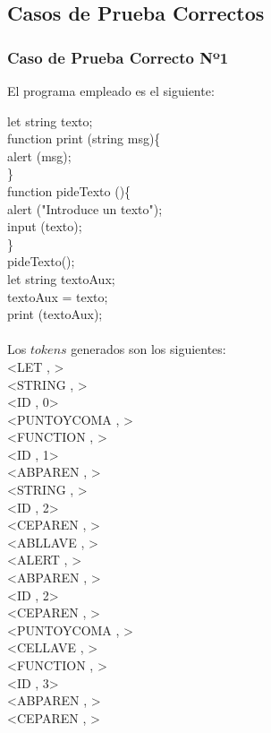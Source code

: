 \documentclass{article}
\begin{document}
\subsection{Casos de Prueba Correctos}
\subsubsection{Caso de Prueba Correcto Nº1}
\begin{center} 
El programa empleado es el siguiente:
\end{center}
\begin{flushleft}
let string texto;\\
function print (string msg)\{ \\
\qquad	alert (msg);\\
\} \\
function pideTexto ()\{ \\
\qquad	alert ("Introduce un texto");\\
\qquad	input (texto);\\
\}\\
pideTexto();\\
let string textoAux;\\
textoAux = texto;\\
print (textoAux);\\
\quad\\
Los $tokens$ generados son los siguientes:\\
<LET , >\\
<STRING , >\\
<ID , 0>\\
<PUNTOYCOMA , >\\
<FUNCTION , >\\
<ID , 1>\\
<ABPAREN , >\\
<STRING , >\\
<ID , 2>\\
<CEPAREN , >\\
<ABLLAVE , >\\
<ALERT , >\\
<ABPAREN , >\\
<ID , 2>\\
<CEPAREN , >\\
<PUNTOYCOMA , >\\
<CELLAVE , >\\
<FUNCTION , >\\
<ID , 3>\\
<ABPAREN , >\\
<CEPAREN , >\\

\end{flushleft}
\end{document}
